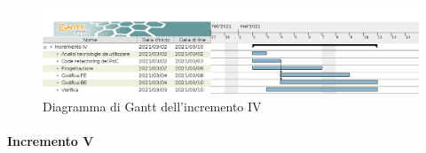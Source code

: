 \begin{figure}[H]
    \centering
    \includegraphics[width=1\linewidth]{res/images/pianificazione/incremento_4.png}
    \caption{Diagramma di Gantt dell'incremento IV}
    \label{fig:_Gantt incremento IV}
\end{figure}

\paragraph[Incremento V]{Incremento V}
